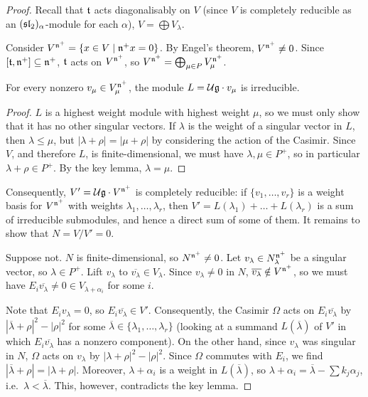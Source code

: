\begin{proof}
Recall that $\at$ acts diagonalisably on $V$ (since $V$ is completely
reducible as an $(\sl_2)_\alpha$-module for each $\alpha$),
$V = \bigoplus V_\lambda$.

Consider $V^{\fn^+} = \setc{x \in V}{\fn^+x = 0}$. By Engel's theorem,
$V^{\fn^+} \neq 0$. Since $[\at, \fn^+] \subseteq \fn^+$, $\at$ acts on
$V^{\fn^+}$, so $V^{\fn^+} = \bigoplus_{\mu \in P} V_\mu^{\fn^+}$.

\begin{claim}
For every nonzero $v_\mu \in V_\mu^{\fn^+}$, the module $L = \U\g \cdot v_\mu$
is irreducible.
\end{claim}

\begin{proof}
$L$ is a highest weight module with highest weight $\mu$, so we must only show
that it has no other singular vectors. If $\lambda$ is the weight of a singular
vector in $L$, then $\lambda \leq \mu$, but $|\lambda + \rho| = |\mu + \rho|$
by considering the action of the Casimir. Since $V$, and therefore $L$, is
finite-dimensional, we must have $\lambda, \mu \in P^+$, so in particular
$\lambda + \rho \in P^+$. By the key lemma, $\lambda = \mu$.
\end{proof}

Consequently, $V' = \U\g \cdot V^{\fn^+}$ is completely reducible: if
$\{v_1, \dots, v_r\}$ is a weight basis for $V^{\fn^+}$ with weights
$\lambda_1, \dots, \lambda_r$, then $V' = L(\lambda_1) + \dots + L(\lambda_r)$
is a sum of irreducible submodules, and hence a direct sum of some of them.
It remains to show that $N = V/V' = 0$.

Suppose not. $N$ is finite-dimensional, so $N^{\fn^+} \neq 0$. Let
$v_\lambda \in N_\lambda^{\fn^+}$ be a singular vector, so $\lambda \in P^+$.
Lift $v_\lambda$ to $\overline{v_\lambda} \in V_\lambda$. Since
$v_\lambda \neq 0$ in $N$, $\overline{v_\lambda} \notin V^{\fn^+}$, so we must
have $E_i\overline{v_\lambda} \neq 0 \in V_{\lambda+\alpha_i}$ for some $i$.

Note that $E_iv_\lambda = 0$, so $E_i\overline{v_\lambda} \in V'$.
Consequently, the Casimir $\Omega$ acts on $E_i\overline{v_\lambda}$ by
$|\overline{\lambda} + \rho|^2 - |\rho|^2$ for some
$\overline{\lambda} \in \{\lambda_1, \dots, \lambda_r\}$ (looking at a
summand $L(\overline\lambda)$ of $V'$ in which $E_i\overline{v_\lambda}$ has a
nonzero component). On the other hand, since $v_\lambda$ was singular in $N$,
$\Omega$ acts on $v_\lambda$ by $|\lambda + \rho|^2 - |\rho|^2$. Since $\Omega$
commutes with $E_i$, we find $|\overline{\lambda} + \rho| = |\lambda + \rho|$.
Moreover, $\lambda + \alpha_i$ is a weight in $L(\overline{\lambda})$, so
$\lambda + \alpha_i = \overline{\lambda} - \sum k_j\alpha_j$, i.e.\
$\lambda < \overline{\lambda}$. This, however, contradicts the key lemma.
\end{proof}

